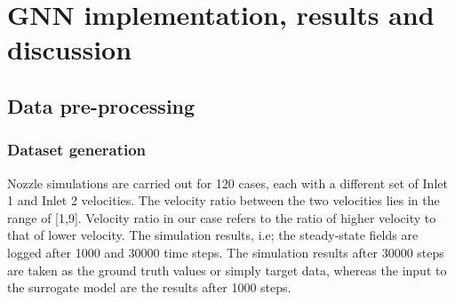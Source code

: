 \chapter{GNN implementation, results and discussion}
\label{chap:Method}
\section{Data pre-processing}
\subsection{Dataset generation}
Nozzle simulations are carried out for 120 cases, each with a different set of Inlet 1 and Inlet 2 velocities. The velocity ratio between the two velocities lies in the range of [1,9]. Velocity ratio in our case refers to the ratio of higher velocity to that of lower velocity.
The simulation results, i.e; the steady-state fields are logged after 1000 and 30000 time steps. The simulation results after 30000 steps are taken as the ground truth values or simply target data, whereas the input to the surrogate model are the results after 1000 steps. 
